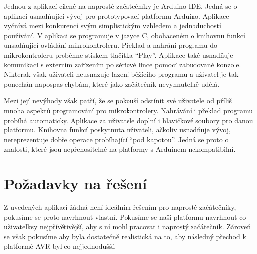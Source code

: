 Jednou z aplikací cílené na naprosté začátečníky je Arduino IDE\cite{arduino-ide}. Jedná se o aplikaci usnadňující vývoj pro prototypovací platformu Arduino. Aplikace vyčnívá mezi konkurencí svým simplistickým vzhledem a jednoduchostí používání. V aplikaci se programuje v jazyce C, obohaceném o knihovnu funkcí unsadňující ovládání mikrokontroleru. Překlad a nahrání programu do mikrokontroleru proběhne stiskem tlačítka ``Play''. Aplikace také usnadňuje komunikaci s externím zařízením po sériové lince pomocí zabudované konzole. Nikterak však uživateli neusnazuje lazení běžícího programu a uživatel je tak ponechán napospas chybám, které jako začátečník nevyhnutelně udělá.

Mezi její nevýhody však patří, že se pokouší odstínit své uživatele od příliš mnoha aspektů programování pro mikrokontrolery. Nahrávání i překlad programu probíhá automaticky. Aplikace za uživatele doplní i hlavičkové soubory pro danou platformu. Knihovna funkcí poskytnuta uživateli, ačkoliv usnadňuje vývoj, nereprezentuje dobře operace probíhající ``pod kapotou''. Jedná se proto o znalosti, které jsou nepřenositelné na platformy s Arduinem nekompatibilní.


\section{Požadavky na řešení}

Z uvedených aplikací žádná není ideálním řešením pro naprosté začátečníky, pokusíme se proto navrhnout vlastní. Pokusíme se naši platformu navrhnout co uživatelksy nejpřívětivější, aby s ní mohl pracovat i naprostý začátečník. Zároveň se však pokusíme aby byla dostatečně realistická na to, aby následný přechod k platformě AVR byl co nejjednodušší.